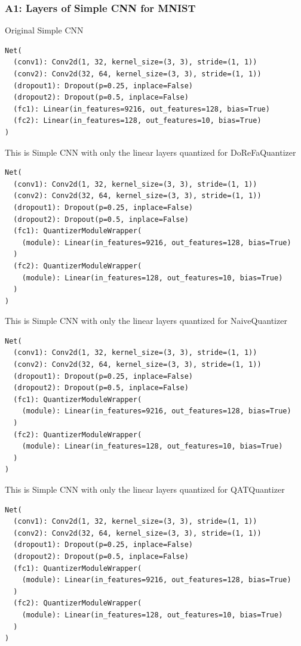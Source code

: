 \documentclass{article}
\begin{document}
\subsubsection{A1: Layers of Simple CNN for MNIST}
\label{sec:A1}
Original Simple CNN
\begin{verbatim}
Net(
  (conv1): Conv2d(1, 32, kernel_size=(3, 3), stride=(1, 1))
  (conv2): Conv2d(32, 64, kernel_size=(3, 3), stride=(1, 1))
  (dropout1): Dropout(p=0.25, inplace=False)
  (dropout2): Dropout(p=0.5, inplace=False)
  (fc1): Linear(in_features=9216, out_features=128, bias=True)
  (fc2): Linear(in_features=128, out_features=10, bias=True)
)
\end{verbatim}

This is Simple CNN with only the linear layers quantized for DoReFaQuantizer
\begin{verbatim}
Net(
  (conv1): Conv2d(1, 32, kernel_size=(3, 3), stride=(1, 1))
  (conv2): Conv2d(32, 64, kernel_size=(3, 3), stride=(1, 1))
  (dropout1): Dropout(p=0.25, inplace=False)
  (dropout2): Dropout(p=0.5, inplace=False)
  (fc1): QuantizerModuleWrapper(
    (module): Linear(in_features=9216, out_features=128, bias=True)
  )
  (fc2): QuantizerModuleWrapper(
    (module): Linear(in_features=128, out_features=10, bias=True)
  )
)
\end{verbatim}

This is Simple CNN with only the linear layers quantized for NaiveQuantizer
\begin{verbatim}
Net(
  (conv1): Conv2d(1, 32, kernel_size=(3, 3), stride=(1, 1))
  (conv2): Conv2d(32, 64, kernel_size=(3, 3), stride=(1, 1))
  (dropout1): Dropout(p=0.25, inplace=False)
  (dropout2): Dropout(p=0.5, inplace=False)
  (fc1): QuantizerModuleWrapper(
    (module): Linear(in_features=9216, out_features=128, bias=True)
  )
  (fc2): QuantizerModuleWrapper(
    (module): Linear(in_features=128, out_features=10, bias=True)
  )
)
\end{verbatim}

This is Simple CNN with only the linear layers quantized for QATQuantizer
\begin{verbatim}
Net(
  (conv1): Conv2d(1, 32, kernel_size=(3, 3), stride=(1, 1))
  (conv2): Conv2d(32, 64, kernel_size=(3, 3), stride=(1, 1))
  (dropout1): Dropout(p=0.25, inplace=False)
  (dropout2): Dropout(p=0.5, inplace=False)
  (fc1): QuantizerModuleWrapper(
    (module): Linear(in_features=9216, out_features=128, bias=True)
  )
  (fc2): QuantizerModuleWrapper(
    (module): Linear(in_features=128, out_features=10, bias=True)
  )
)
\end{verbatim}
\end{document}

